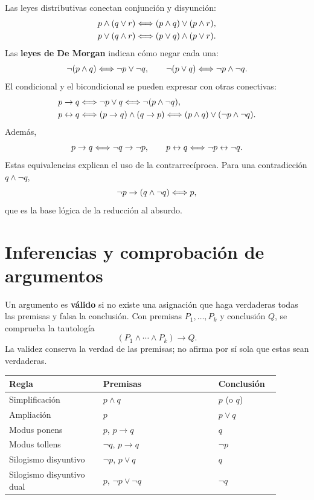 Las leyes distributivas conectan conjunción y disyunción:
\begin{align*}
 p\wedge(q\vee r)&\Longleftrightarrow(p\wedge q)\vee(p\wedge r),\\
 p\vee(q\wedge r)&\Longleftrightarrow(p\vee q)\wedge(p\vee r).
\end{align*}
Las \textbf{leyes de De Morgan} indican cómo negar cada una:
\[
 \neg(p\wedge q)\Longleftrightarrow\neg p\vee\neg q,\qquad
 \neg(p\vee q)\Longleftrightarrow\neg p\wedge\neg q.
\]
El condicional y el bicondicional se pueden expresar con otras conectivas:
\begin{align*}
 p\to q&\Longleftrightarrow\neg p\vee q\Longleftrightarrow\neg(p\wedge\neg q),\\
 p\leftrightarrow q&\Longleftrightarrow(p\to q)\wedge(q\to p)
                 \Longleftrightarrow(p\wedge q)\vee(\neg p\wedge\neg q).
\end{align*}
Además,
\[
 p\to q\Longleftrightarrow\neg q\to\neg p,\qquad
 p\leftrightarrow q\Longleftrightarrow\neg p\leftrightarrow\neg q.
\]
Estas equivalencias explican el uso de la contrarrecíproca.
Para una contradicción $q\wedge\neg q$,
\[
 \neg p\to(q\wedge\neg q)\Longleftrightarrow p,
\]
que es la base lógica de la reducción al absurdo.

\section{Inferencias y comprobación de argumentos}
\label{sec:inferencias}

Un argumento es \textbf{válido} si no existe una asignación que haga
verdaderas todas las premisas y falsa la conclusión. Con premisas
$P_1,\ldots,P_k$ y conclusión $Q$, se comprueba la tautología
\[
 (P_1\wedge\cdots\wedge P_k)\to Q.
\]
La validez conserva la verdad de las premisas; no afirma por sí sola
que estas sean verdaderas.

\begin{center}
\small
\begin{tabular}{@{}p{0.31\linewidth}p{0.38\linewidth}p{0.20\linewidth}@{}}
\toprule
Regla & Premisas & Conclusión\\
\midrule
Simplificación & $p\wedge q$ & $p$ (o $q$)\\
Ampliación & $p$ & $p\vee q$\\
Modus ponens & $p$, $p\to q$ & $q$\\
Modus tollens & $\neg q$, $p\to q$ & $\neg p$\\
Silogismo disyuntivo & $\neg p$, $p\vee q$ & $q$\\
Silogismo disyuntivo dual & $p$, $\neg p\vee\neg q$ & $\neg q$\\
\bottomrule
\end{tabular}
\end{center}

